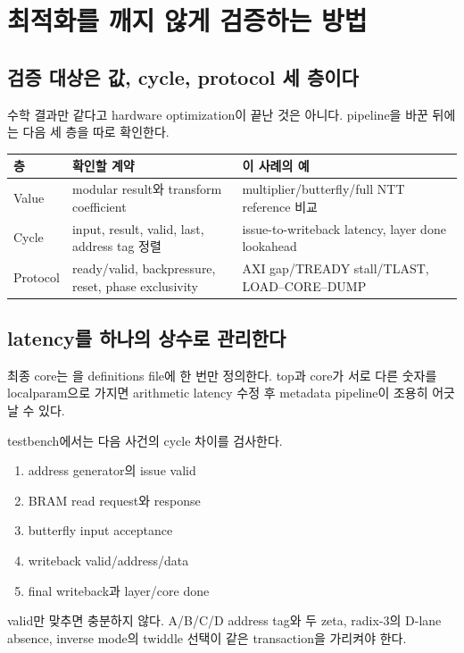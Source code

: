 \chapter{최적화를 깨지 않게 검증하는 방법}

\section{검증 대상은 값, cycle, protocol 세 층이다}

수학 결과만 같다고 hardware optimization이 끝난 것은 아니다. pipeline을 바꾼
뒤에는 다음 세 층을 따로 확인한다.

\begin{longtable}{L{28mm}L{61mm}L{72mm}}
\toprule
층 & 확인할 계약 & 이 사례의 예 \\
\midrule
Value & modular result와 transform coefficient & multiplier/butterfly/full NTT reference 비교 \\
Cycle & input, result, valid, last, address tag 정렬 & issue-to-writeback latency, layer done lookahead \\
Protocol & ready/valid, backpressure, reset, phase exclusivity & AXI gap/TREADY stall/TLAST, LOAD--CORE--DUMP \\
\bottomrule
\end{longtable}

\section{latency를 하나의 상수로 관리한다}

최종 core는 을 definitions file에 한 번만
정의한다. top과 core가 서로 다른 숫자를 localparam으로 가지면 arithmetic
latency 수정 후 metadata pipeline이 조용히 어긋날 수 있다.

testbench에서는 다음 사건의 cycle 차이를 검사한다.

\begin{enumerate}
  \item address generator의 issue valid
  \item BRAM read request와 response
  \item butterfly input acceptance
  \item writeback valid/address/data
  \item final writeback과 layer/core done
\end{enumerate}

valid만 맞추면 충분하지 않다. A/B/C/D address tag와 두 zeta, radix-3의 D-lane
absence, inverse mode의 twiddle 선택이 같은 transaction을 가리켜야 한다.

